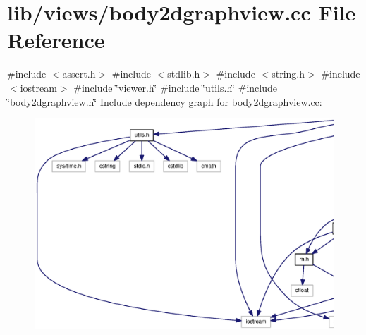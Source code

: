 \section{lib/views/body2dgraphview.cc \-File \-Reference}
\label{body2dgraphview_8cc}
{\ttfamily \#include $<$assert.\-h$>$}\*
{\ttfamily \#include $<$stdlib.\-h$>$}\*
{\ttfamily \#include $<$string.\-h$>$}\*
{\ttfamily \#include $<$iostream$>$}\*
{\ttfamily \#include \char`\"{}viewer.\-h\char`\"{}}\*
{\ttfamily \#include \char`\"{}utils.\-h\char`\"{}}\*
{\ttfamily \#include \char`\"{}body2dgraphview.\-h\char`\"{}}\*
\-Include dependency graph for body2dgraphview.\-cc\-:
\nopagebreak
\begin{figure}[H]
\begin{center}
\leavevmode
\includegraphics[width=350pt]{body2dgraphview_8cc__incl}
\end{center}
\end{figure}
